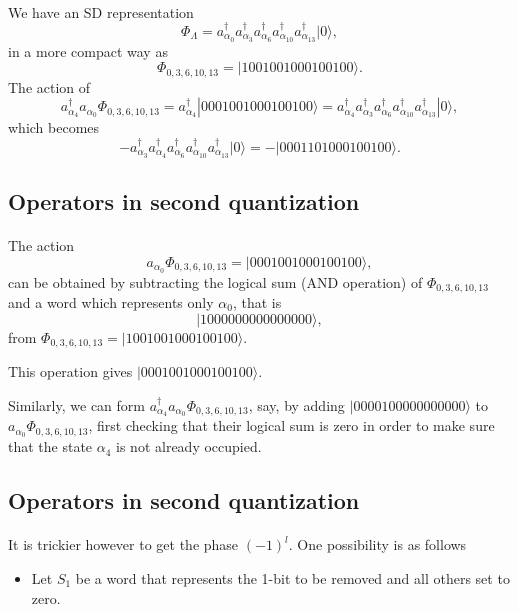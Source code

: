 \paragraph{}
We have an SD representation
\[
\Phi_{\Lambda} = a_{\alpha_0}^{\dagger} a_{\alpha_3}^{\dagger} a_{\alpha_6}^{\dagger} a_{\alpha_{10}}^{\dagger} a_{\alpha_{13}}^{\dagger} |0\rangle,
\]
in a more compact way as
\[
\Phi_{0,3,6,10,13} = |1001001000100100\rangle.
\]
The action of
\[
a^{\dagger}_{\alpha_4}a_{\alpha_0}\Phi_{0,3,6,10,13} = a^{\dagger}_{\alpha_4}|0001001000100100\rangle=a^{\dagger}_{\alpha_4}a_{\alpha_3}^{\dagger} a_{\alpha_6}^{\dagger} a_{\alpha_{10}}^{\dagger} a_{\alpha_{13}}^{\dagger} |0\rangle,
\]
which becomes
\[
-a_{\alpha_3}^{\dagger} a^{\dagger}_{\alpha_4} a_{\alpha_6}^{\dagger} a_{\alpha_{10}}^{\dagger} a_{\alpha_{13}}^{\dagger} |0\rangle=-|0001101000100100\rangle.
\]



\subsection*{Operators in second quantization}

\paragraph{}
The action
\[
a_{\alpha_0}\Phi_{0,3,6,10,13} = |0001001000100100\rangle,
\]
can be obtained by subtracting the logical sum (AND operation) of $\Phi_{0,3,6,10,13}$ and 
a word which represents only $\alpha_0$, that is
\[
|1000000000000000\rangle,
\] 
from $\Phi_{0,3,6,10,13}= |1001001000100100\rangle$.

This operation gives $|0001001000100100\rangle$. 

Similarly, we can form $a^{\dagger}_{\alpha_4}a_{\alpha_0}\Phi_{0,3,6,10,13}$, say, by adding 
$|0000100000000000\rangle$ to $a_{\alpha_0}\Phi_{0,3,6,10,13}$, first checking that their logical sum
is zero in order to make sure that the state $\alpha_4$ is not already occupied.



\subsection*{Operators in second quantization}

\paragraph{}
It is trickier however to get the phase $(-1)^l$. 
One possibility is as follows
\begin{itemize}
\item Let $S_1$ be a word that represents the 1-bit to be removed and all others set to zero.
\end{itemize}

